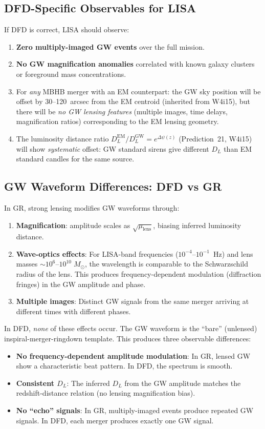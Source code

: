 \documentclass[11pt]{article}
\theoremstyle{definition}
\theoremstyle{remark}
\newcommand{\Msun}{M_\odot}
\begin{document}
\subsection{DFD-Specific Observables for LISA}

If DFD is correct, LISA should observe:
\begin{enumerate}[nosep]
\item \textbf{Zero multiply-imaged GW events} over the full mission.
\item \textbf{No GW magnification anomalies} correlated with known
  galaxy clusters or foreground mass concentrations.
\item For \emph{any} MBHB merger with an EM counterpart:
  the GW sky position will be offset by 30--120~arcsec from the
  EM centroid (inherited from W4i15), but there will be
  \emph{no GW lensing features} (multiple images, time delays,
  magnification ratios) corresponding to the EM lensing geometry.
\item The luminosity distance ratio $D_L^{\mathrm{EM}}/D_L^{\mathrm{GW}}
  = e^{\Delta\psi(z)}$ (Prediction~21, W4i15) will show
  \emph{systematic} offset: GW standard sirens give different
  $D_L$ than EM standard candles for the same source.
\end{enumerate}

\subsection{GW Waveform Differences: DFD vs GR}

In GR, strong lensing modifies GW waveforms through:
\begin{enumerate}[nosep]
\item \textbf{Magnification}: amplitude scales as $\sqrt{\mu_{\mathrm{lens}}}$,
  biasing inferred luminosity distance.
\item \textbf{Wave-optics effects}: For LISA-band frequencies
  ($10^{-4}$--$10^{-1}$~Hz) and lens masses $\sim 10^6$--$10^{10}\;\Msun$,
  the wavelength is comparable to the Schwarzschild radius of the
  lens.  This produces frequency-dependent modulation (diffraction
  fringes) in the GW amplitude and phase.
\item \textbf{Multiple images}: Distinct GW signals from the same
  merger arriving at different times with different phases.
\end{enumerate}

In DFD, \emph{none} of these effects occur.  The GW waveform is
the ``bare'' (unlensed) inspiral-merger-ringdown template.  This
produces three observable differences:
\begin{itemize}[nosep]
\item \textbf{No frequency-dependent amplitude modulation}:
  In GR, lensed GW show a characteristic beat pattern.
  In DFD, the spectrum is smooth.
\item \textbf{Consistent $D_L$}: The inferred $D_L$ from the GW
  amplitude matches the redshift-distance relation (no lensing
  magnification bias).
\item \textbf{No ``echo'' signals}: In GR, multiply-imaged events
  produce repeated GW signals.  In DFD, each merger produces
  exactly one GW signal.
\end{itemize}
\end{document}
